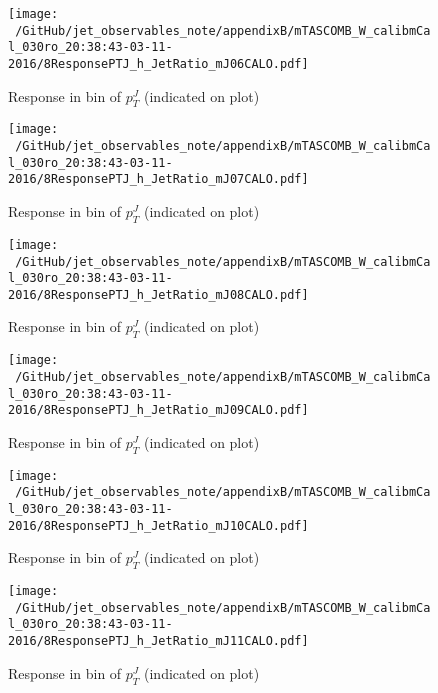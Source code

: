 \begin{figure}

\texttt{[image: ~/GitHub/jet\_observables\_note/appendixB/mTASCOMB\_W\_calibmCal\_030ro\_20:38:43-03-11-2016/8ResponsePTJ\_h\_JetRatio\_mJ06CALO.pdf]}
\caption{Response in bin of  $p_{T}^{J}$ (indicated on plot)} 

\end{figure}

%
\begin{figure}

\texttt{[image: ~/GitHub/jet\_observables\_note/appendixB/mTASCOMB\_W\_calibmCal\_030ro\_20:38:43-03-11-2016/8ResponsePTJ\_h\_JetRatio\_mJ07CALO.pdf]}
\caption{Response in bin of  $p_{T}^{J}$ (indicated on plot)} 

\end{figure}


\begin{figure}

\texttt{[image: ~/GitHub/jet\_observables\_note/appendixB/mTASCOMB\_W\_calibmCal\_030ro\_20:38:43-03-11-2016/8ResponsePTJ\_h\_JetRatio\_mJ08CALO.pdf]}
\caption{Response in bin of  $p_{T}^{J}$ (indicated on plot)} 

\end{figure}

\begin{figure}

\texttt{[image: ~/GitHub/jet\_observables\_note/appendixB/mTASCOMB\_W\_calibmCal\_030ro\_20:38:43-03-11-2016/8ResponsePTJ\_h\_JetRatio\_mJ09CALO.pdf]}
\caption{Response in bin of  $p_{T}^{J}$ (indicated on plot)} 

\end{figure}

\begin{figure}

\texttt{[image: ~/GitHub/jet\_observables\_note/appendixB/mTASCOMB\_W\_calibmCal\_030ro\_20:38:43-03-11-2016/8ResponsePTJ\_h\_JetRatio\_mJ10CALO.pdf]}
\caption{Response in bin of  $p_{T}^{J}$ (indicated on plot)} 

\end{figure}

\begin{figure}

\texttt{[image: ~/GitHub/jet\_observables\_note/appendixB/mTASCOMB\_W\_calibmCal\_030ro\_20:38:43-03-11-2016/8ResponsePTJ\_h\_JetRatio\_mJ11CALO.pdf]}
\caption{Response in bin of  $p_{T}^{J}$ (indicated on plot)} 

\end{figure}

